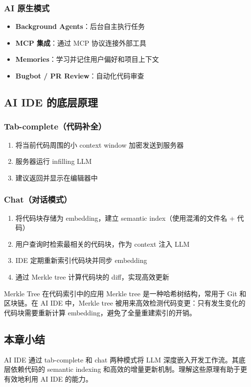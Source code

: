 \subsubsection{AI 原生模式}

\begin{itemize}
    \item \textbf{Background Agents}：后台自主执行任务
    \item \textbf{MCP 集成}：通过 MCP 协议连接外部工具
    \item \textbf{Memories}：学习并记住用户偏好和项目上下文
    \item \textbf{Bugbot / PR Review}：自动化代码审查
\end{itemize}

\subsection{AI IDE 的底层原理}

\subsubsection{Tab-complete（代码补全）}

\begin{enumerate}
    \item 将当前代码周围的小 context window 加密发送到服务器
    \item 服务器运行 infilling LLM
    \item 建议返回并显示在编辑器中
\end{enumerate}

\subsubsection{Chat（对话模式）}

\begin{enumerate}
    \item 将代码块存储为 embedding，建立 semantic index（使用混淆的文件名 + 代码）
    \item 用户查询时检索最相关的代码块，作为 context 注入 LLM
    \item IDE 定期重新索引代码块并同步 embedding
    \item 通过 Merkle tree 计算代码块的 diff，实现高效更新
\end{enumerate}

\begin{importantbox}{Merkle Tree 在代码索引中的应用}
Merkle tree 是一种哈希树结构，常用于 Git 和区块链。在 AI IDE 中，Merkle tree 被用来高效检测代码变更：只有发生变化的代码块需要重新计算 embedding，避免了全量重建索引的开销。
\end{importantbox}

\subsection{本章小结}

AI IDE 通过 tab-complete 和 chat 两种模式将 LLM 深度嵌入开发工作流。其底层依赖代码的 semantic indexing 和高效的增量更新机制。理解这些原理有助于更有效地利用 AI IDE 的能力。

